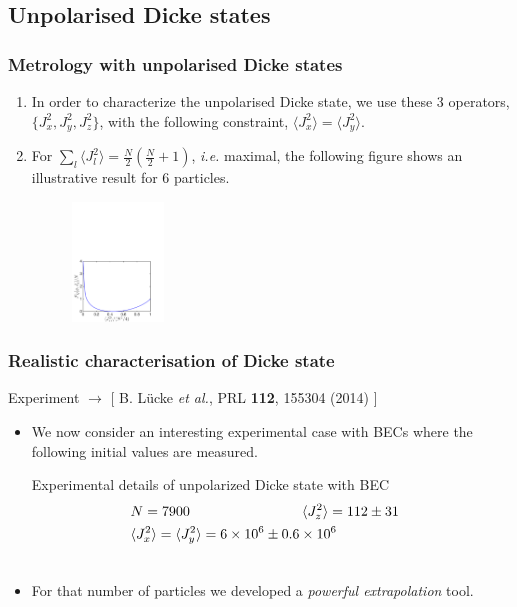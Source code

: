 \documentclass{beamer}
\newcommand{\expect}[1]{\ensuremath{\langle #1 \rangle}}
\newcommand{\citate}[1]{{\footnotesize{\color{gray}[ #1 ]}}

	}
\def\bea{\begin{eqnarray}}
\def\eea{\end{eqnarray}}
\def\nnnl{\nonumber\\}
\begin{document}
	\subsection{Unpolarised Dicke states}

		\begin{frame}
			\frametitle{Metrology with unpolarised Dicke states}
			\begin{enumerate}
				\item<1-> In order to characterize the unpolarised Dicke state, we use these 3 operators, $\{J_x^2,J_y^2,J_z^2\}$, with the following constraint, $\expect{J_x^2}=\expect{J_y^2}$.
				\item<2-> For $\sum_l \expect{J_l^2} = \tfrac{N}{2} (\tfrac{N}{2}+1)$, {\it i.e.} maximal, the following figure shows an illustrative result  for 6 particles.
				\begin{figure}
					\includegraphics[height=120px]{img/upperboundary-dicke.pdf}
				\end{figure}

			\end{enumerate}

		\end{frame}

		\begin{frame}
			\frametitle{Realistic characterisation of Dicke state}
			{\small Experiment $\rightarrow$}
			\citate{B. L\"ucke {\it et al.}, PRL \textbf{112}, 155304 (2014)}

			\begin{itemize}
				\item We now consider an interesting experimental case with BECs where the following initial values are measured.
				\begin{block}{Experimental details of unpolarized Dicke state with BEC}
					\vspace{-1px}
					\bea
					 	&N = 7900 \hspace{80px} \expect{J_z^2}=112\pm 31 &\nnnl
						&\expect{J_x^2}=\expect{J_y^2}  =  6 \times 10^6 \pm 0.6\times 10^6 &\nnnl
						\nonumber
					\eea
				\end{block}

				\item For that number of particles we developed a \emph{\color{blue}powerful extrapolation} tool.
			\end{itemize}
		\end{frame}
\end{document}
